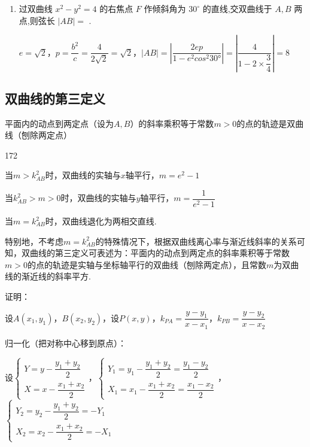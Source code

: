 \begin{enumerate}
\begin{jieda}
        \ps 去绝对值：同负异正.
    \end{jieda}
    
    \item 过双曲线 ${x}^{2} - {y}^{2} = 4$ 的右焦点 $F$ 作倾斜角为 ${30}^{ \circ  }$ 的直线,交双曲线于 $A,B$ 两点,则弦长 $\left| {AB}\right|  =$ .
    \begin{jieda}
        $e = \sqrt{2}$，$p = \dfrac{b^2}{c} = \dfrac{4}{2\sqrt{2}} = \sqrt{2}$，$|AB| = \left|\dfrac{2ep}{1-e^2cos^2\ang{30}}\right| = \left|\dfrac{4}{1-2\times \dfrac{3}{4}}\right| = 8$
    \end{jieda}
    
\end{enumerate}
\subsection*{双曲线的第三定义}
平面内的动点到两定点（设为$A, B$）的斜率乘积等于常数$m > 0$的点的轨迹是双曲线（刨除两定点）
\begin{dingautolist}{172}
    \item 当$m > k^2_{AB}$时，双曲线的实轴与$x$轴平行，$m = e^2 - 1$
    \item 当$k^2_{AB} > m > 0$时，双曲线的实轴与$y$轴平行，$m = \dfrac{1}{e^2-1}$
    \item 当$m = k^2_{AB}$时，双曲线退化为两相交直线.
\end{dingautolist}

特别地，不考虑$m = k^2_{AB}$的特殊情况下，根据双曲线离心率与渐近线斜率的关系可知，双曲线的第三定义可表述为：平面内的动点到两定点的斜率乘积等于常数$m > 0$的点的轨迹是实轴与坐标轴平行的双曲线（刨除两定点），且常数$m$为双曲线的渐近线的斜率平方.

证明：

设$A(x_1, y_1)$，$B(x_2, y_2)$，设$P(x, y)$，$k_{PA} = \dfrac{y-y_1}{x-x_1}$，$k_{PB} = \dfrac{y - y_2}{x-x_2}$

归一化（把对称中心移到原点）：

设$\left\{ \begin{array}{l}
     Y = y - \dfrac{y_1+y_2}{2}  \\
     X = x - \dfrac{x_1+x_2}{2}
\end{array}\right.$，$\left\{ \begin{array}{l}
     Y_1 = y_1 - \dfrac{y_1+y_2}{2} = \dfrac{y_1-y_2}{2}  \\
     X_1 = x_1 - \dfrac{x_1+x_2}{2} = \dfrac{x_1-x_2}{2}
\end{array}\right.$，$\left\{ \begin{array}{l}
     Y_2 = y_2 - \dfrac{y_1+y_2}{2} = -Y_1 \\
     X_2 = x_2 - \dfrac{x_1+x_2}{2} = -X_1
\end{array}\right.$

